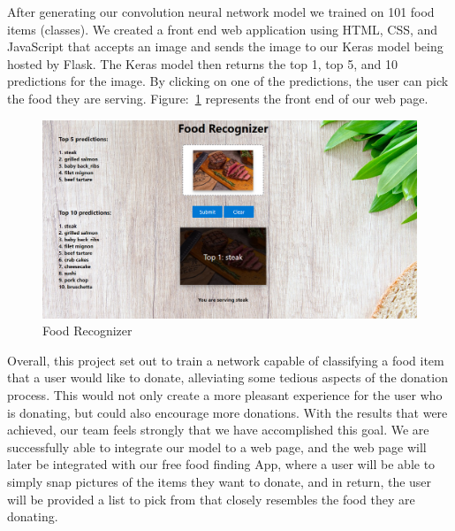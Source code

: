 \documentclass[conference]{IEEEtran}
\begin{document}
After generating our convolution neural network model we trained on 101 food items (classes). We created a front end web application using HTML, CSS, and JavaScript that accepts an image and sends the image to our Keras model being hosted by Flask. The Keras model then returns the top 1, top 5, and 10 predictions for the image. By clicking on one of the predictions, the user can pick the food they are serving. Figure:~\ref{fig:fig2} represents the front end of our web page.

\FloatBarrier
\begin{figure}[htbp]
\centerline
{\includegraphics[width=\columnwidth]{images/3.png}}
\caption{Food Recognizer}
\label{fig:fig2}
\end{figure}

Overall, this project set out to train a network capable of classifying a food item that a user would like to donate, alleviating some tedious aspects of the donation process. This would not only create a more pleasant experience for the user who is donating, but could also encourage more donations. With the results that were achieved, our team feels strongly that we have accomplished this goal. We are successfully able to integrate our model to a web page, and the web page will later be integrated with our free food finding App, where a user will be able to simply snap pictures of the items they want to donate, and in return, the user will be provided a list to pick from that closely resembles the food they are donating. 



\end{document}
